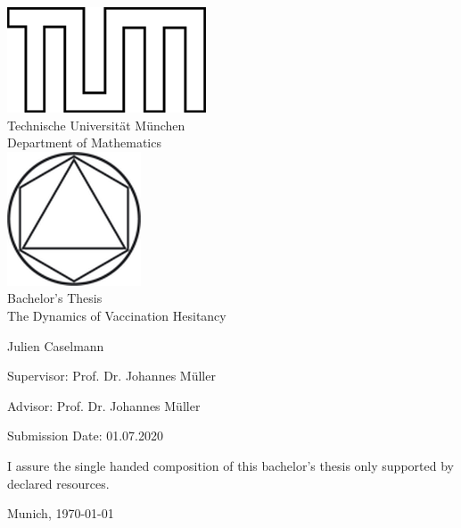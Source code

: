 \documentclass[12pt,a4paper,twoside]{article}
\begin{document}
\pagestyle{empty}
\begin{titlepage}
\begin{center}
\includegraphics{img/TUMlblack.png}\\[3mm]
\sf
{\Large
  Technische Universit\"at M\"unchen\\[5mm]
  Department of Mathematics\\[8mm]
}
\normalsize
\includegraphics{img/TUMlMblack.png}\\[15mm]

Bachelor's Thesis\\[15mm]

{\Huge
  The Dynamics of Vaccination Hesitancy
}
\bigskip

\normalsize

Julien Caselmann
\end{center}
\vspace*{75mm}

Supervisor: Prof. Dr. Johannes M\"uller
\medskip

Advisor: Prof. Dr. Johannes M\"uller
\medskip

Submission Date: 01.07.2020

\end{titlepage}

\vspace*{150mm}

I assure the single handed composition of this bachelor's thesis only supported by declared resources.
\bigskip

Munich, \today \newline

\begin{figure}[h!]
	\hfill
	\begin{minipage}{.4\textwidth}\centering
		\def\svgwidth{350pt}
		
	\end{minipage}	
\end{figure}
\end{document}
